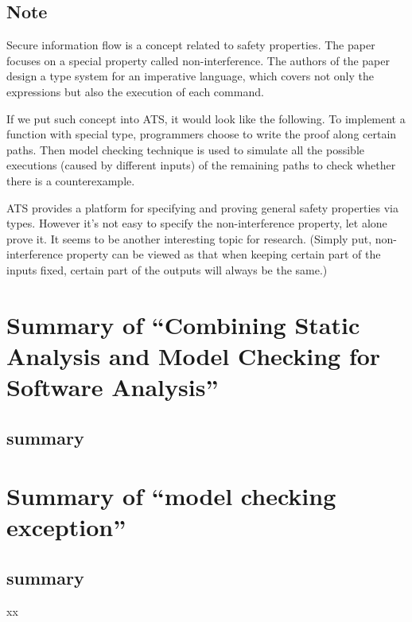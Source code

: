 \documentclass{llncs}
\begin{document}
\subsection{Note}

Secure information flow is a concept related to safety properties. The paper focuses on
a special property called non-interference. The authors of the paper
design a type system for an imperative language, which covers not only the expressions but
also the execution of each command.

If we put such concept into ATS, it would look like the following. To implement a function
with special type, programmers choose to write the proof along certain paths. Then model
checking technique is used to simulate all the possible executions (caused by different
inputs) of the remaining paths to check whether there is a counterexample.

ATS provides a platform for specifying and proving general safety properties via types.
However it's not easy to specify the non-interference property, let alone prove it. 
It seems to be another interesting topic for research.
(Simply put, non-interference property can be viewed as that when keeping certain part
of the inputs fixed, certain part of the outputs will always be the same.)

\newpage

\section{Summary of ``Combining Static Analysis and Model Checking for 
Software Analysis''\cite{Brat2001Combining}} 
  \label{section:static_analysis_model_checking}

\subsection{summary}

\newpage

\section{Summary of ``model checking exception''} 
  \label{section:idea}




\subsection{summary}
xx
\end{document}
